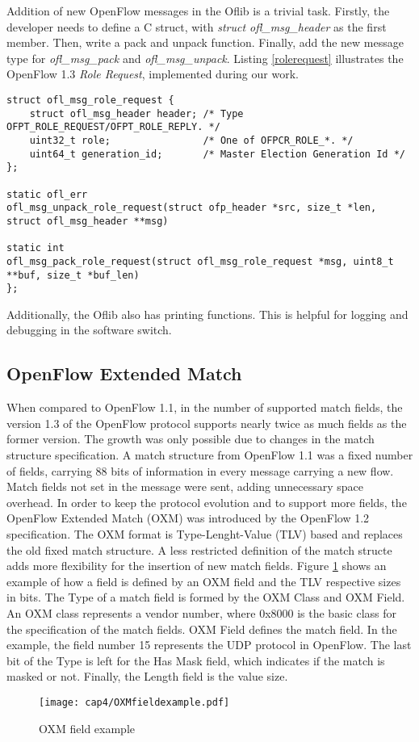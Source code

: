 Addition of new OpenFlow messages in the Oflib is a trivial task. Firstly, the developer needs to define a C struct, with \textit{struct ofl_msg_header} as the first member. Then, write a pack and unpack function. Finally, add the new message type for \textit{ofl_msg_pack} and \textit{ofl_msg_unpack}. Listing \ref{rolerequest} illustrates the OpenFlow 1.3 \textit{Role Request}, implemented during our work. 
\pagebreak
\begin{lstlisting}[caption={Oflib message Role request struct and function definition}, label=rolerequest,]
struct ofl_msg_role_request {
	struct ofl_msg_header header; /* Type OFPT_ROLE_REQUEST/OFPT_ROLE_REPLY. */
	uint32_t role;                /* One of OFPCR_ROLE_*. */
	uint64_t generation_id;       /* Master Election Generation Id */
};

static ofl_err
ofl_msg_unpack_role_request(struct ofp_header *src, size_t *len, struct ofl_msg_header **msg)

static int
ofl_msg_pack_role_request(struct ofl_msg_role_request *msg, uint8_t **buf, size_t *buf_len)
};
\end{lstlisting}

Additionally, the Oflib also has printing functions. This is helpful for logging and debugging in the software switch.      

\subsection{OpenFlow Extended Match}
\label{sec:sec42}

When compared to OpenFlow 1.1, in the number of supported match fields, the version 1.3 of the OpenFlow protocol supports nearly twice as much fields as the former version. The growth was only possible due to changes in the match structure specification. A match structure from OpenFlow 1.1 was a fixed number of fields, carrying 88 bits of information in every message carrying a new flow. Match fields not set in the message were sent, adding unnecessary space overhead.   
In order to keep the protocol evolution and to support more fields, the OpenFlow Extended Match (OXM) was introduced by the OpenFlow 1.2 specification. The OXM format is Type-Lenght-Value (TLV) based and replaces the old fixed match structure. A less restricted definition of the match structe adds more flexibility for the insertion of new match fields. Figure \ref{fig:oxmfield} shows an example of how a field is defined by an OXM field and the TLV respective sizes in bits. The Type of a match field is formed by the OXM Class and OXM Field. An OXM class represents a vendor number, where 0x8000 is the basic class for the specification of the match fields. OXM Field defines the match field. In the example, the field number 15 represents the UDP protocol in OpenFlow. The last bit of the Type is left for the Has Mask field, which indicates if the match is masked or not. Finally, the Length field is the value size.
\\
\begin{figure}[H]
\centering
\texttt{[image: cap4/OXMfieldexample.pdf]}
\caption{OXM field example}
\label{fig:oxmfield}
\end{figure}

